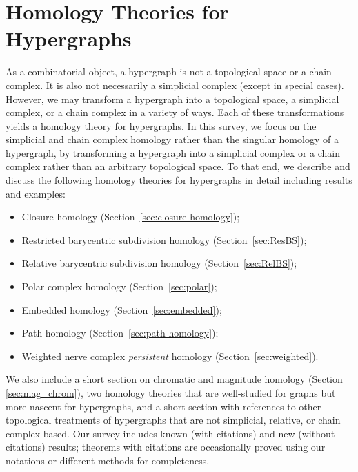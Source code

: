 \documentclass{amsart}
\begin{document}
\section{Homology Theories for Hypergraphs}
\label{sec:homology}
As a combinatorial object, a hypergraph is not a topological space or a chain complex. It is also not necessarily a simplicial complex (except in special cases). However, we may transform a hypergraph into a topological space, a simplicial complex, or a chain complex in a variety of ways. Each of these transformations yields a homology theory for hypergraphs. In this survey, we focus on the simplicial and chain complex homology rather than the singular homology of a hypergraph, by transforming a hypergraph into a simplicial complex or a chain complex rather than an arbitrary topological space. 
To that end, we describe and discuss the following homology theories for hypergraphs in detail including results and examples:
\begin{itemize}
\item {Closure homology} (Section~\ref{sec:closure-homology});
\item {Restricted barycentric subdivision homology} (Section~\ref{sec:ResBS});
\item {Relative barycentric subdivision homology} (Section~\ref{sec:RelBS});
\item {Polar complex homology} (Section~\ref{sec:polar}); 
\item {Embedded homology} (Section~\ref{sec:embedded});
\item {Path homology} (Section~\ref{sec:path-homology});
\item {Weighted nerve complex \emph{persistent} homology} (Section~\ref{sec:weighted}).
\end{itemize} 
We also include a short section on chromatic and magnitude homology (Section \ref{sec:mag_chrom}), two homology theories that are well-studied for graphs but more nascent for hypergraphs, and a short section with references to other topological treatments of hypergraphs that are not simplicial, relative, or chain complex based.
Our survey includes known (with citations) and new (without citations) results; theorems with citations are occasionally proved using our notations or different methods for completeness.  
\end{document}
